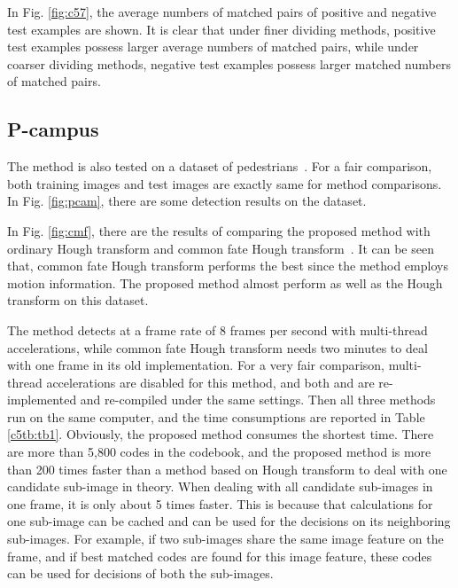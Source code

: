 \documentclass[paper]{ieice}
\begin{document}
In Fig. \ref{fig:c57}, the average numbers of matched pairs of positive and negative test examples are shown. It is clear that under finer dividing methods, positive test examples possess larger average numbers of matched pairs, while under coarser dividing methods, negative test examples possess larger matched numbers of matched pairs.


\subsection{P-campus}

The method is also tested on a dataset of pedestrians~\cite{wang1}. For a fair comparison, both training images and test images are exactly same for method comparisons.
In Fig. \ref{fig:pcam}, there are some detection results on the dataset.

In Fig. \ref{fig:cmf}, there are the results of comparing the proposed method with ordinary Hough transform and common fate Hough transform~\cite{wang1}. It can be seen that, common fate Hough transform performs the best since the method employs motion information. The proposed method almost perform as well as the Hough transform on this dataset.



The method detects at a frame rate of 8 frames per second with multi-thread accelerations, while common fate Hough transform needs two minutes to deal with one frame in its old implementation. For a very fair comparison, multi-thread accelerations are disabled for this method, and both \cite{ac9} and \cite{wang1} are re-implemented and re-compiled under the same settings. Then all three methods run on the same computer, and the time consumptions are reported in Table \ref{c5tb:tb1}. Obviously, the proposed method consumes the shortest time. There are more than 5,800 codes in the codebook, and the proposed method is more than 200 times faster than a method based on Hough transform to deal with one candidate sub-image in theory. When dealing with all candidate sub-images in one frame, it is only about 5 times faster. This is because that calculations for one sub-image can be cached and can be used for the decisions on its neighboring sub-images. For example, if two sub-images share the same image feature on the frame, and if best matched codes are found for this image feature, these codes can be used for decisions of both the sub-images.
\end{document}
